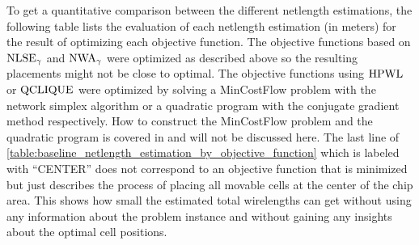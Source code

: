 To get a quantitative comparison between the different netlength estimations,
the following table lists the evaluation of each netlength estimation (in meters)
for the result of optimizing each objective function.
The objective functions based on \(\operatorname{NLSE}_\gamma\) and \(\operatorname{NWA}_\gamma\)
were optimized as described above so the resulting placements might not be close to optimal.
The objective functions using \(\operatorname{HPWL}\) or \(\operatorname{QCLIQUE}\) were optimized
by solving a MinCostFlow problem with the network simplex algorithm 
or a quadratic program with the conjugate gradient method respectively.
How to construct the MinCostFlow problem and the quadratic program is covered in \cite[pp. 5-7]{BrennerVygen-AnalyticalMethodsInVlsiPlacement}
and will not be discussed here.
The last line of \cref{table:baseline_netlength_estimation_by_objective_function} which is labeled with \enquote{CENTER}
does not correspond to an objective function that is minimized 
but just describes the process of placing all movable cells at the center of the chip area.
This shows how small the estimated total wirelengths can get without using any information about the problem instance
and without gaining any insights about the optimal cell positions.

